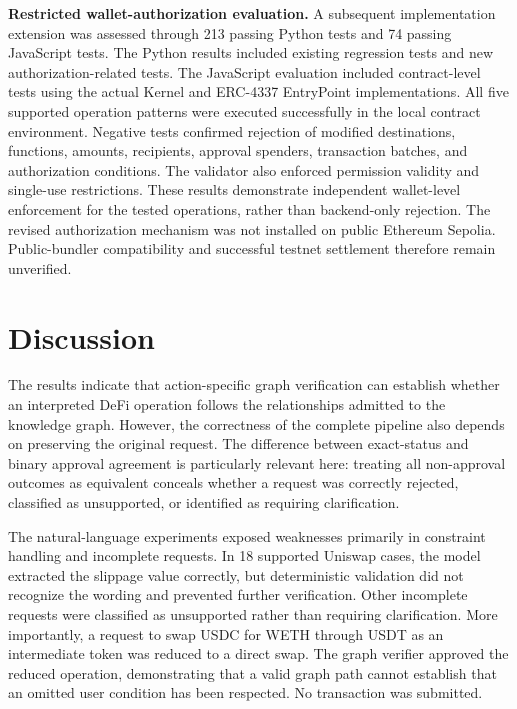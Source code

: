 \noindent\textbf{Restricted wallet-authorization evaluation.}
A subsequent implementation extension was assessed through
213 passing Python tests and 74 passing JavaScript tests.
The Python results included existing regression tests and
new authorization-related tests. The JavaScript evaluation
included contract-level tests using the actual Kernel and
ERC-4337 EntryPoint implementations. All five supported operation patterns were executed successfully
in the local contract environment. Negative tests confirmed
rejection of modified destinations, functions, amounts,
recipients, approval spenders, transaction batches, and
authorization conditions. The validator also enforced
permission validity and single-use restrictions. These
results demonstrate independent wallet-level enforcement
for the tested operations, rather than backend-only rejection. The revised authorization mechanism was not installed on
public Ethereum Sepolia. Public-bundler compatibility and
successful testnet settlement therefore remain unverified.



\section{Discussion}
\label{sec:evaluation_discussion}

The results indicate that action-specific graph verification can establish
whether an interpreted DeFi operation follows the relationships admitted to
the knowledge graph. However, the correctness of the complete pipeline also
depends on preserving the original request. The difference between exact-status
and binary approval agreement is particularly relevant here: treating all
non-approval outcomes as equivalent conceals whether a request was correctly
rejected, classified as unsupported, or identified as requiring clarification.

The natural-language experiments exposed weaknesses primarily in constraint
handling and incomplete requests. In 18 supported Uniswap cases, the model
extracted the slippage value correctly, but deterministic validation did not
recognize the wording and prevented further verification. Other incomplete
requests were classified as unsupported rather than requiring clarification.
More importantly, a request to swap USDC for WETH through USDT as an
intermediate token was reduced to a direct swap. The graph verifier approved
the reduced operation, demonstrating that a valid graph path cannot establish
that an omitted user condition has been respected. No transaction was submitted.

